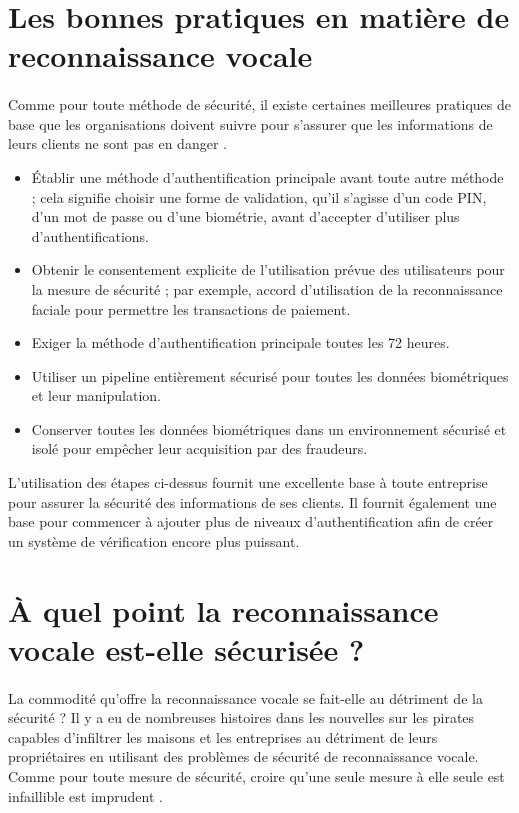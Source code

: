 \section{Les bonnes pratiques en matière de reconnaissance vocale}
\paragraph{}Comme pour toute méthode de sécurité, il existe certaines meilleures pratiques de base que les organisations doivent suivre pour s'assurer que les informations de leurs clients ne sont pas en danger \cite{mathworks}.

\begin{itemize}
    \item Établir une méthode d'authentification principale avant toute autre méthode ; cela signifie choisir une forme de validation, qu'il s'agisse d'un code PIN, d'un mot de passe ou d'une biométrie, avant d'accepter d'utiliser plus d'authentifications.
    \item Obtenir le consentement explicite de l'utilisation prévue des utilisateurs pour la mesure de sécurité ; par exemple, accord d'utilisation de la reconnaissance faciale pour permettre les transactions de paiement.
    \item Exiger la méthode d'authentification principale toutes les 72 heures.
    \item Utiliser un pipeline entièrement sécurisé pour toutes les données biométriques et leur manipulation.
    \item Conserver toutes les données biométriques dans un environnement sécurisé et isolé pour empêcher leur acquisition par des fraudeurs.
\end{itemize}
L'utilisation des étapes ci-dessus fournit une excellente base à toute entreprise pour assurer la sécurité des informations de ses clients. Il fournit également une base pour commencer à ajouter plus de niveaux d'authentification afin de créer un système de vérification encore plus puissant.

\section{À quel point la reconnaissance vocale est-elle sécurisée ?}
\paragraph{}La commodité qu'offre la reconnaissance vocale se fait-elle au détriment de la sécurité ? Il y a eu de nombreuses histoires dans les nouvelles sur les pirates capables d'infiltrer les maisons et les entreprises au détriment de leurs propriétaires en utilisant des problèmes de sécurité de reconnaissance vocale. Comme pour toute mesure de sécurité, croire qu'une seule mesure à elle seule est infaillible est imprudent \cite{softjourn}.
